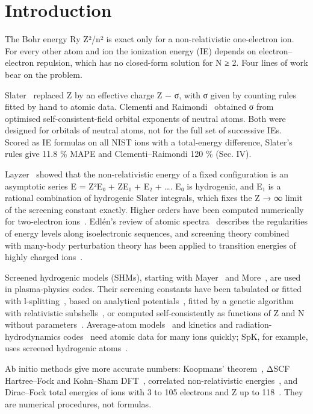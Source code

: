 \documentclass[aps,pra,preprint,notitlepage,superscriptaddress,amsmath,amssymb]{revtex4-2}
\begin{document}
\section{Introduction}

The Bohr energy Ry Z²/n² is exact only for a non-relativistic one-electron ion. For every other atom and ion the ionization energy (IE) depends on electron–electron repulsion, which has no closed-form solution for N ≥ 2. Four lines of work bear on the problem.


Slater~\cite{r1} replaced Z by an effective charge Z − σ, with σ given by counting rules fitted by hand to atomic data. Clementi and Raimondi~\cite{r2,r3} obtained σ from optimised self-consistent-field orbital exponents of neutral atoms. Both were designed for orbitals of neutral atoms, not for the full set of successive IEs. Scored as IE formulas on all NIST ions with a total-energy difference, Slater's rules give 11.8 \% MAPE and Clementi–Raimondi 120 \% (Sec. IV).


Layzer~\cite{r4,r5} showed that the non-relativistic energy of a fixed configuration is an asymptotic series E = Z²E₀ + ZE₁ + E₂ + …. E₀ is hydrogenic, and E₁ is a rational combination of hydrogenic Slater integrals, which fixes the Z → ∞ limit of the screening constant exactly. Higher orders have been computed numerically for two-electron ions~\cite{r6,r7}. Edlén's review of atomic spectra~\cite{r8} describes the regularities of energy levels along isoelectronic sequences, and screening theory combined with many-body perturbation theory has been applied to transition energies of highly charged ions~\cite{r9}.


Screened hydrogenic models (SHMs), starting with Mayer~\cite{r10} and More~\cite{r11}, are used in plasma-physics codes. Their screening constants have been tabulated or fitted with l-splitting~\cite{r12,r13}, based on analytical potentials~\cite{r14,r15}, fitted by a genetic algorithm with relativistic subshells~\cite{r16}, or computed self-consistently as functions of Z and N without parameters~\cite{r17,r18,r19,r20,r21}. Average-atom models~\cite{r22} and kinetics and radiation-hydrodynamics codes~\cite{r23,r24} need atomic data for many ions quickly; SpK, for example, uses screened hydrogenic atoms~\cite{r24}.


Ab initio methods give more accurate numbers: Koopmans' theorem~\cite{r25}, ΔSCF Hartree–Fock and Kohn–Sham DFT~\cite{r26,r27}, correlated non-relativistic energies~\cite{r28}, and Dirac–Fock total energies of ions with 3 to 105 electrons and Z up to 118~\cite{r29}. They are numerical procedures, not formulas.
\end{document}
